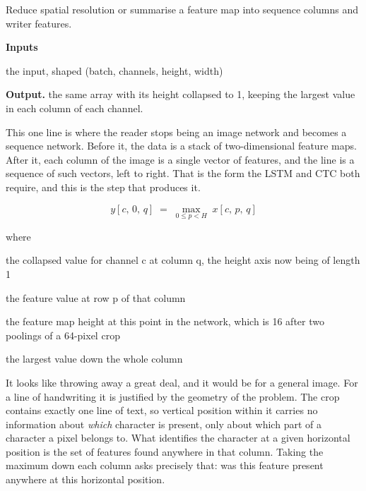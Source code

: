Reduce spatial resolution or summarise a feature map into sequence columns and writer features.




\noindent\textbf{Inputs}
\begin{description}[leftmargin=2.2em,style=nextline,font=\normalfont\ttfamily]\setlength\itemsep{1pt}
  \item[{x}] \normalfont the input, shaped (batch, channels, height, width)
\end{description}

\noindent\textbf{Output.} the same array with its height collapsed to 1, keeping the largest value in each column of each channel.


This one line is where the reader stops being an image network and becomes a sequence network. Before it, the data is a stack of two-dimensional feature maps. After it, each column of the image is a single vector of features, and the line is a sequence of such vectors, left to right. That is the form the LSTM and CTC both require, and this is the step that produces it.


\begin{equation}
y[c,\,0,\,q] \;=\; \max_{0 \le p < H} \; x[c,\,p,\,q]
\end{equation}

\noindent where
\begin{description}[leftmargin=2.4em,style=nextline,font=\normalfont\ttfamily]\setlength\itemsep{1pt}
  \item[{$y[c,0,q]$}] \normalfont the collapsed value for channel c at column q, the height axis now being of length 1
  \item[{$x[c,p,q]$}] \normalfont the feature value at row p of that column
  \item[{$H$}] \normalfont the feature map height at this point in the network, which is 16 after two poolings of a 64-pixel crop
  \item[{$\max_{0 \le p < H}$}] \normalfont the largest value down the whole column
\end{description}

It looks like throwing away a great deal, and it would be for a general image. For a line of handwriting it is justified by the geometry of the problem. The crop contains exactly one line of text, so vertical position within it carries no information about \emph{which} character is present, only about which part of a character a pixel belongs to. What identifies the character at a given horizontal position is the set of features found anywhere in that column. Taking the maximum down each column asks precisely that: was this feature present anywhere at this horizontal position.

